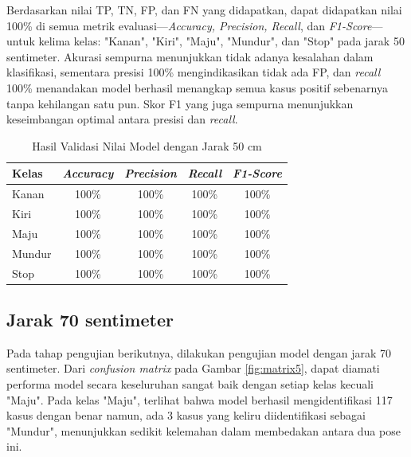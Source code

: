 Berdasarkan nilai TP, TN, FP, dan FN yang didapatkan, dapat didapatkan nilai 100\% di semua metrik evaluasi—\emph{Accuracy, Precision, Recall}, dan \emph{F1-Score}—untuk kelima kelas: "Kanan", "Kiri", "Maju", "Mundur", dan "Stop" pada jarak 50 sentimeter. Akurasi sempurna menunjukkan tidak adanya kesalahan dalam klasifikasi, sementara presisi 100\% mengindikasikan tidak ada FP, dan \emph{recall} 100\% menandakan model berhasil menangkap semua kasus positif sebenarnya tanpa kehilangan satu pun. Skor F1 yang juga sempurna menunjukkan keseimbangan optimal antara presisi dan \emph{recall}.

\begin{longtable}{|l|c|c|c|c|}
  \caption{Hasil Validasi Nilai Model dengan Jarak 50 cm}
  \label{tb:vs_model3} \\
  \hline
  \rowcolor[HTML]{C0C0C0} 
  \textbf{Kelas} & \textbf{\emph{Accuracy}} & \textbf{\emph{Precision}} & \textbf{\emph{Recall}} & \textbf{\emph{F1-Score}} \\ \hline
  Kanan    & 100\%            & 100\%             & 100\%           & 100\%            \\ \hline
  Kiri     & 100\%          & 100\%           & 100\%           & 100\%           \\ \hline
  Maju      & 100\%          & 100\%           & 100\%          & 100\%          \\ \hline
  Mundur     & 100\%            & 100\%             & 100\%           & 100\%            \\ \hline
  Stop  & 100\%            & 100\%             & 100\%           & 100\%            \\ \hline
\end{longtable}

\subsection{Jarak 70 sentimeter}

Pada tahap pengujian berikutnya, dilakukan pengujian model dengan jarak 70 sentimeter. Dari \emph{confusion matrix} pada Gambar \ref{fig:matrix5}, dapat diamati performa model secara keseluruhan sangat baik dengan setiap kelas kecuali "Maju". Pada kelas "Maju", terlihat bahwa model berhasil mengidentifikasi 117 kasus dengan benar namun, ada 3 kasus yang keliru diidentifikasi sebagai "Mundur", menunjukkan sedikit kelemahan dalam membedakan antara dua pose ini.

